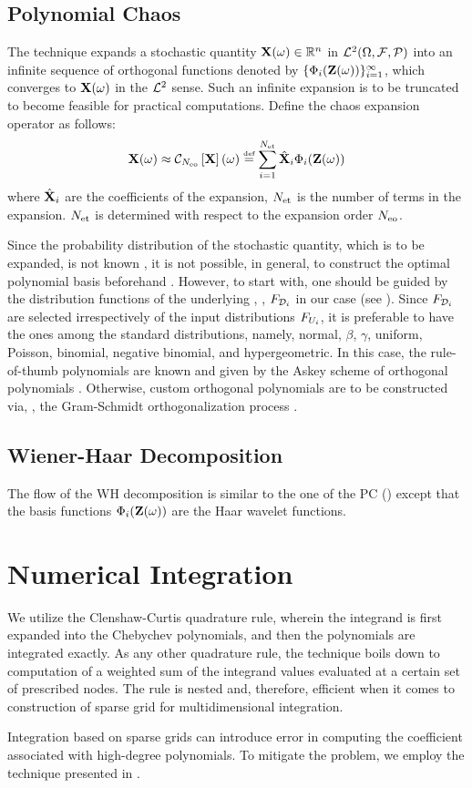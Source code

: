 \subsection{Polynomial Chaos} 
The technique expands a stochastic quantity $\mathbf{X}(\omega) \in \mathbb{R}^n$ in $\mathcal{L}^{2}(\Omega, \mathcal{F}, \mathcal{P})$ into an infinite sequence of orthogonal functions denoted by $\{ \Phi_i(\mathbf{Z}(\omega)) \}_{i = 1}^\infty$, which converges to $\mathbf{X}(\omega)$ in the $\mathcal{L}^{2}$ sense. Such an infinite expansion is to be truncated to become feasible for practical computations. Define the chaos expansion operator as follows:
\[
  \v{X}(\o) \approx \oPC{\Neo}{\v{X}}(\o) \eqdef \sum_{i = 1}^{\Net} \generalCoeff{\v{X}}_i \generalBasis_i(\vZ(\o))
\]
where $\hat{\mathbf{X}}_i$ are the coefficients of the expansion, ${N_\text{et}}$ is the number of terms in the expansion. ${N_\text{et}}$ is determined with respect to the expansion order ${N_\text{eo}}$.

Since the probability distribution of the stochastic quantity, which is to be expanded, is not known \apriori, it is not possible, in general, to construct the optimal polynomial basis beforehand \cite{maitre2010}. However, to start with, one should be guided by the distribution functions of the underlying \rvs, \ie, $F_{\mathcal{D}_i}$ in our case (see ). Since $F_{\mathcal{D}_i}$ are selected irrespectively of the input distributions $F_{U_i}$, it is preferable to have the ones among the standard distributions, namely, normal, $\beta$, $\gamma$,  uniform, Poisson, binomial, negative binomial, and hypergeometric. In this case, the rule-of-thumb polynomials are known and given by the Askey scheme of orthogonal polynomials \cite{xiu2002}. Otherwise, custom orthogonal polynomials are to be constructed via, \eg, the Gram-Schmidt orthogonalization process \cite{witteveen2006}.

\subsection{Wiener-Haar Decomposition} 
The flow of the WH decomposition is similar to the one of the PC () except that the basis functions $\Phi_i(\mathbf{Z}(\omega))$ are the Haar wavelet functions.

\section{Numerical Integration}
We utilize the Clenshaw-Curtis quadrature rule, wherein the integrand is first expanded into the Chebychev polynomials, and then the polynomials are integrated exactly. As any other quadrature rule, the technique boils down to computation of a weighted sum of the integrand values evaluated at a certain set of prescribed nodes. The rule is nested and, therefore, efficient when it comes to construction of sparse grid for multidimensional integration.

Integration based on sparse grids can introduce error in computing the coefficient associated with high-degree polynomials. To mitigate the problem, we employ the technique presented in \cite{constantine2012}.
